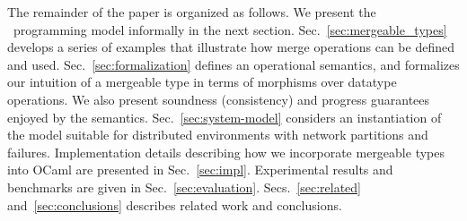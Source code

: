 \noindent The remainder of the paper is organized as follows.  We present the
\name\ programming model informally in the next section.
Sec.~\ref{sec:mergeable_types} develops a series of examples that
illustrate how merge operations can be defined and used.
Sec.~\ref{sec:formalization} defines an operational semantics, and
formalizes our intuition of a mergeable type in terms of morphisms over
datatype operations.  We also present soundness (consistency) and
progress guarantees enjoyed by the
semantics. Sec.~\ref{sec:system-model} considers an instantiation of
the model suitable for distributed environments with network
partitions and failures.  Implementation details describing how we
incorporate mergeable types into OCaml are presented in
Sec.~\ref{sec:impl}.  Experimental results and benchmarks are given in
Sec.~\ref{sec:evaluation}.  Secs.~\ref{sec:related}
and~\ref{sec:conclusions} describes related work and conclusions.





